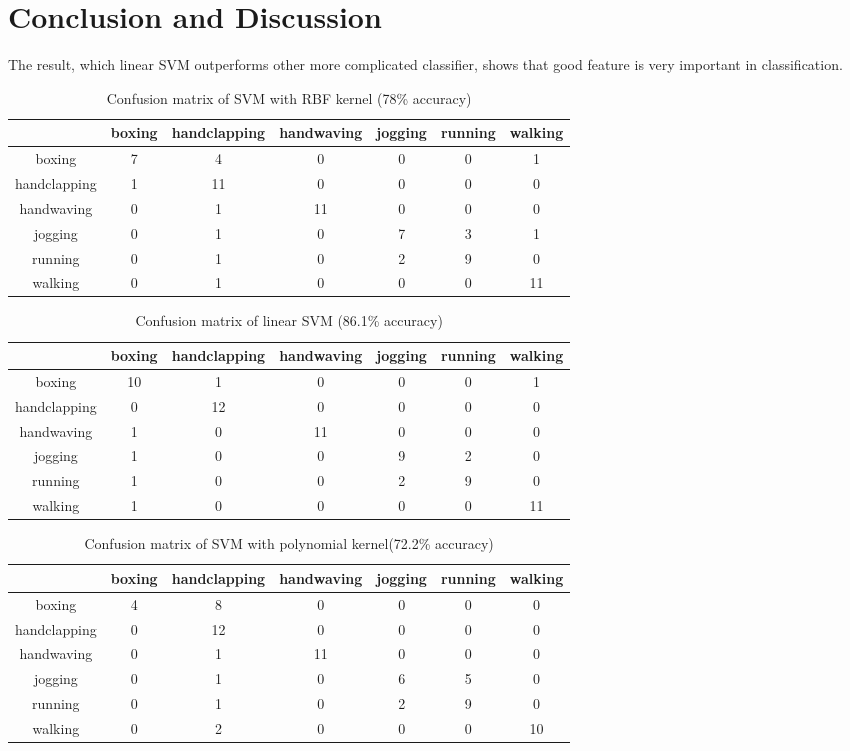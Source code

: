 \documentclass{article}
\begin{document}
\section{Conclusion and Discussion}
The result, which linear SVM outperforms other more complicated classifier, shows that good feature is very important in classification.
\begin{table}
\caption{Confusion matrix of SVM with RBF kernel (78\% accuracy)}
\begin{center}
\begin{tabular}{c|cccccc}\hline
&boxing&handclapping &handwaving &jogging &running &walking\\ \hline
boxing&7& 4& 0& 0& 0& 1\\
handclapping&1& 11& 0& 0& 0& 0\\
handwaving&0& 1& 11&0 &0 &0 \\
jogging&0& 1& 0&7 &3 &1 \\
running&0& 1&0 &2 &9 &0 \\
walking&0&1 &0 &0 &0 &11 \\ \hline
\end{tabular}
\end{center}
\end{table} 

\begin{table}
\caption{Confusion matrix of linear SVM (86.1\% accuracy)}
\begin{center}
\begin{tabular}{c|cccccc}\hline
&boxing&handclapping &handwaving &jogging &running &walking\\ \hline
boxing&10& 1& 0& 0& 0& 1\\
handclapping&0& 12& 0& 0& 0& 0\\
handwaving&1& 0& 11&0 &0 &0 \\
jogging&1& 0& 0&9 &2 &0 \\
running&1& 0&0 &2 &9 &0 \\
walking&1&0 &0 &0 &0 &11 \\ \hline
\end{tabular}
\end{center}
\end{table} 

\begin{table}
\caption{Confusion matrix of SVM with polynomial kernel(72.2\% accuracy)}
\begin{center}
\begin{tabular}{c|cccccc}\hline
&boxing&handclapping &handwaving &jogging &running &walking\\ \hline
boxing&4& 8& 0& 0& 0& 0\\
handclapping&0& 12& 0& 0& 0& 0\\
handwaving&0& 1& 11&0 &0 &0 \\
jogging&0& 1& 0&6 &5 &0 \\
running&0& 1&0&2 &9 &0 \\
walking&0&2 &0 &0 &0 &10 \\ \hline
\end{tabular}
\end{center}
\end{table} 
\end{document}

